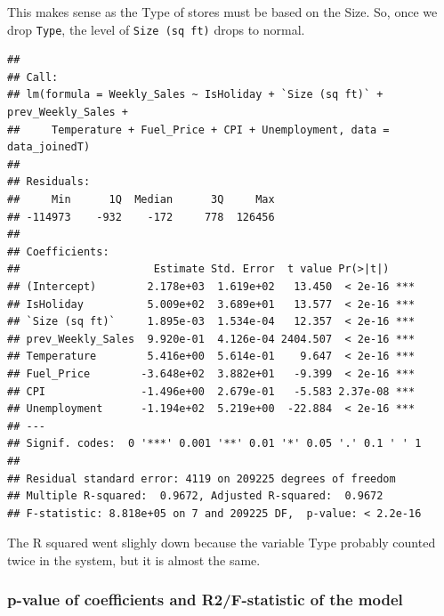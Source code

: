 \documentclass[11pt,]{article}
\newenvironment{Shaded}{\begin{snugshade}}{\end{snugshade}}
\newcommand{\KeywordTok}[1]{\textcolor[rgb]{0.13,0.29,0.53}{\textbf{{#1}}}}
\newcommand{\DataTypeTok}[1]{\textcolor[rgb]{0.13,0.29,0.53}{{#1}}}
\newcommand{\StringTok}[1]{\textcolor[rgb]{0.31,0.60,0.02}{{#1}}}
\newcommand{\CommentTok}[1]{\textcolor[rgb]{0.56,0.35,0.01}{\textit{{#1}}}}
\newcommand{\NormalTok}[1]{{#1}}
\begin{document}
This makes sense as the Type of stores must be based on the Size. So,
once we drop \texttt{Type}, the level of \texttt{Size\ (sq\ ft)} drops
to normal.

\begin{Shaded}
\end{Shaded}

\begin{verbatim}
## 
## Call:
## lm(formula = Weekly_Sales ~ IsHoliday + `Size (sq ft)` + prev_Weekly_Sales + 
##     Temperature + Fuel_Price + CPI + Unemployment, data = data_joinedT)
## 
## Residuals:
##     Min      1Q  Median      3Q     Max 
## -114973    -932    -172     778  126456 
## 
## Coefficients:
##                     Estimate Std. Error  t value Pr(>|t|)    
## (Intercept)        2.178e+03  1.619e+02   13.450  < 2e-16 ***
## IsHoliday          5.009e+02  3.689e+01   13.577  < 2e-16 ***
## `Size (sq ft)`     1.895e-03  1.534e-04   12.357  < 2e-16 ***
## prev_Weekly_Sales  9.920e-01  4.126e-04 2404.507  < 2e-16 ***
## Temperature        5.416e+00  5.614e-01    9.647  < 2e-16 ***
## Fuel_Price        -3.648e+02  3.882e+01   -9.399  < 2e-16 ***
## CPI               -1.496e+00  2.679e-01   -5.583 2.37e-08 ***
## Unemployment      -1.194e+02  5.219e+00  -22.884  < 2e-16 ***
## ---
## Signif. codes:  0 '***' 0.001 '**' 0.01 '*' 0.05 '.' 0.1 ' ' 1
## 
## Residual standard error: 4119 on 209225 degrees of freedom
## Multiple R-squared:  0.9672, Adjusted R-squared:  0.9672 
## F-statistic: 8.818e+05 on 7 and 209225 DF,  p-value: < 2.2e-16
\end{verbatim}

The R squared went slighly down because the variable Type probably
counted twice in the system, but it is almost the same.

\subsubsection{p-value of coefficients and R2/F-statistic of the
model}\label{p-value-of-coefficients-and-r2f-statistic-of-the-model}
\end{document}
